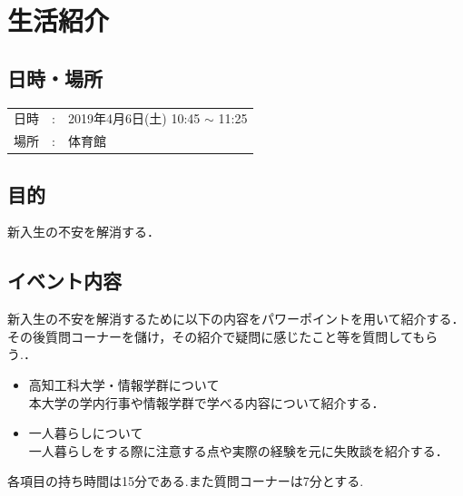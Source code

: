 \documentclass[a4j,titlepage]{jarticle}
\begin{document}
\section{生活紹介}

\subsection{日時・場所}

\begin{tabular}{p{}rp{}}
  日時 & : & 2019年4月6日(土) 10:45 $\sim$ 11:25 \\ %
  場所 & : & 体育館
\end{tabular}

\subsection{目的}
新入生の不安を解消する．

\subsection{イベント内容}
新入生の不安を解消するために以下の内容をパワーポイントを用いて紹介する．その後質問コーナーを儲け，その紹介で疑問に感じたこと等を質問してもらう.．

\begin{itemize}
\item 高知工科大学・情報学群について \\
  本大学の学内行事や情報学群で学べる内容について紹介する．
\item 一人暮らしについて \\
  一人暮らしをする際に注意する点や実際の経験を元に失敗談を紹介する．
\end{itemize}

各項目の持ち時間は15分である.また質問コーナーは7分とする.
\end{document}
